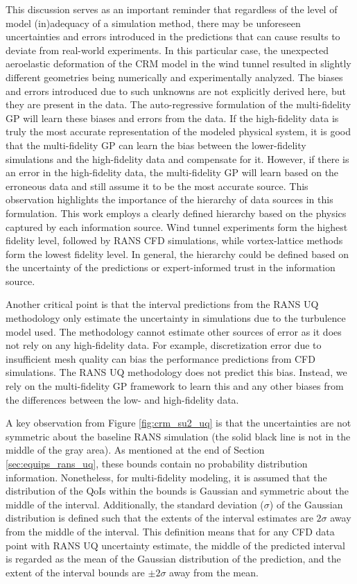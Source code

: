 This discussion serves as an important reminder that regardless of the level of model (in)adequacy of a simulation method, there may be unforeseen uncertainties and errors introduced in the predictions that can cause results to deviate from real-world experiments.
In this particular case, the unexpected aeroelastic deformation of the CRM model in the wind tunnel resulted in slightly different geometries being numerically and experimentally analyzed.
The biases and errors introduced due to such unknowns are not explicitly derived here, but they are present in the data.
The auto-regressive formulation of the multi-fidelity GP will learn these biases and errors from the data.
If the high-fidelity data is truly the most accurate representation of the modeled physical system, it is good that the multi-fidelity GP can learn the bias between the lower-fidelity simulations and the high-fidelity data and compensate for it.
However, if there is an error in the high-fidelity data, the multi-fidelity GP will learn based on the erroneous data and still assume it to be the most accurate source. 
This observation highlights the importance of the hierarchy of data sources in this formulation.
This work employs a clearly defined hierarchy based on the physics captured by each information source.
Wind tunnel experiments form the highest fidelity level, followed by RANS CFD simulations, while vortex-lattice methods form the lowest fidelity level.
In general, the hierarchy could be defined based on the uncertainty of the predictions or expert-informed trust in the information source.

Another critical point is that the interval predictions from the RANS UQ methodology only estimate the uncertainty in simulations due to the turbulence model used.
The methodology cannot estimate other sources of error as it does not rely on any high-fidelity data.
For example, discretization error due to insufficient mesh quality can bias the performance predictions from CFD simulations. 
The RANS UQ methodology does not predict this bias.
Instead, we rely on the multi-fidelity GP framework to learn this and any other biases from the differences between the low- and high-fidelity data. 

A key observation from Figure \ref{fig:crm_su2_uq} is that the uncertainties are not symmetric about the baseline RANS simulation (the solid black line is not in the middle of the gray area).
As mentioned at the end of Section \ref{sec:equips_rans_uq}, these bounds contain no probability distribution information.
Nonetheless, for multi-fidelity modeling, it is assumed that the distribution of the QoIs within the bounds is Gaussian and symmetric about the middle of the interval.
Additionally, the standard deviation ($\sigma$) of the Gaussian distribution is defined such that the extents of the interval estimates are $2\sigma$ away from the middle of the interval.
This definition means that for any CFD data point with RANS UQ uncertainty estimate, the middle of the predicted interval is regarded as the mean of the Gaussian distribution of the prediction, and the extent of the interval bounds are $\pm 2\sigma$ away from the mean.

